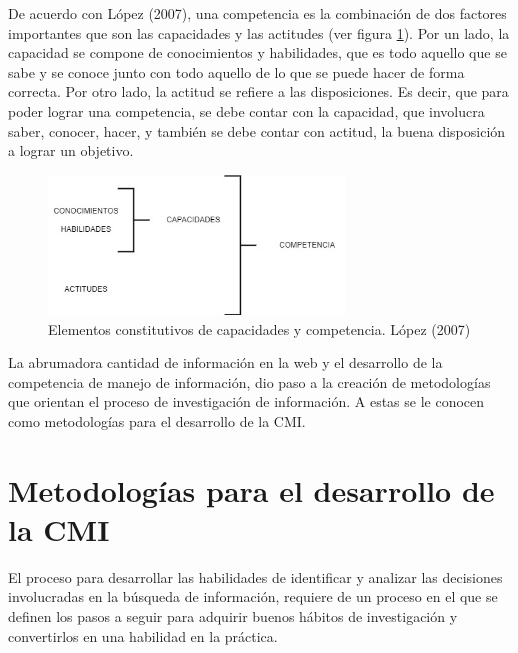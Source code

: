 De acuerdo con López (2007), una competencia es la combinación de dos factores importantes que son las capacidades y las actitudes (ver figura \ref{fig:21}). Por un lado, la capacidad se compone de conocimientos y habilidades, que es todo aquello que se sabe y se conoce junto con todo aquello de lo que se puede hacer de forma correcta. Por otro lado, la actitud se refiere a las disposiciones. Es decir, que para poder lograr una competencia, se debe contar con la capacidad, que involucra saber, conocer, hacer, y también se debe contar con actitud, la buena disposición a lograr un objetivo.

\begin{figure}
  \centering
  \includegraphics[width=0.70\textwidth]{Cap2/Figuras/CMI.jpg}
  \caption{Elementos constitutivos de capacidades y competencia. López (2007)}
  \label{fig:21}
\end{figure}

La abrumadora cantidad de información en la web y el desarrollo de la competencia de manejo de información, dio paso a la creación de metodologías que orientan el proceso de investigación de información. A estas se le conocen como metodologías para el desarrollo de la CMI.


\section{Metodologías para el desarrollo de la CMI}
\label{secMetodologiasCap2}

El proceso para desarrollar las habilidades de identificar y analizar las decisiones involucradas en la búsqueda de información, requiere de un proceso en el que se definen los pasos a seguir para adquirir buenos hábitos de investigación y convertirlos en una habilidad en la práctica.

